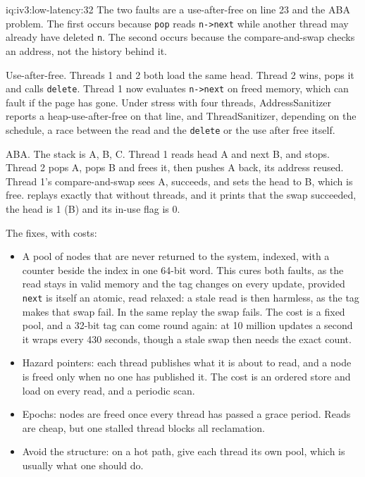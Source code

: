 \begin{solution}{iq:iv3:low-latency:32}
The two faults are a use-after-free on line 23 and the ABA problem. The first occurs because \texttt{pop} reads \texttt{n->next} while another thread may already have deleted \texttt{n}. The second occurs because the compare-and-swap checks an address, not the history behind it.

Use-after-free. Threads 1 and 2 both load the same head. Thread 2 wins, pops it and calls \texttt{delete}. Thread 1 now evaluates \texttt{n->next} on freed memory, which can fault if the page has gone. Under stress with four threads, AddressSanitizer reports a heap-use-after-free on that line, and ThreadSanitizer, depending on the schedule, a race between the read and the \texttt{delete} or the use after free itself.

ABA. The stack is A, B, C. Thread 1 reads head A and next B, and stops. Thread 2 pops A, pops B and frees it, then pushes A back, its address reused. Thread 1's compare-and-swap sees A, succeeds, and sets the head to B, which is free.  replays exactly that without threads, and it prints that the swap succeeded, the head is 1 (B) and its in-use flag is 0.
\label{lst:iv3:ll:aba}

The fixes, with costs:
\begin{itemize}
\item A pool of nodes that are never returned to the system, indexed, with a counter beside the index in one 64-bit word. This cures both faults, as the read stays in valid memory and the tag changes on every update, provided \texttt{next} is itself an atomic, read relaxed: a stale read is then harmless, as the tag makes that swap fail. In the same replay the swap fails. The cost is a fixed pool, and a 32-bit tag can come round again: at 10 million updates a second it wraps every 430 seconds, though a stale swap then needs the exact count.
\item Hazard pointers: each thread publishes what it is about to read, and a node is freed only when no one has published it. The cost is an ordered store and load on every read, and a periodic scan.
\item Epochs: nodes are freed once every thread has passed a grace period. Reads are cheap, but one stalled thread blocks all reclamation.
\item Avoid the structure: on a hot path, give each thread its own pool, which is usually what one should do.
\end{itemize}

\end{solution}

